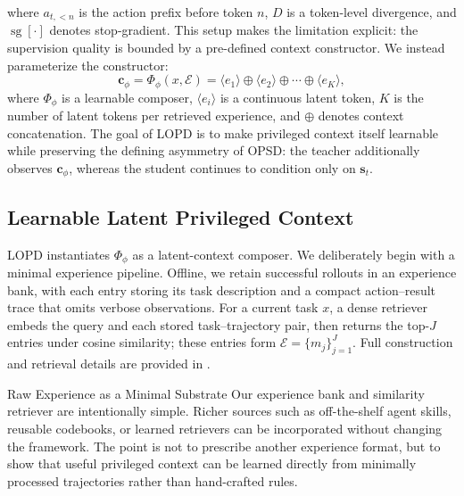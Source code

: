 \documentclass{article} %
\newcommand{\ourmethod}{{\textsc{LOPD}}\xspace}
\begin{document}
where $a_{t,<n}$ is the action prefix before token $n$, $D$ is a token-level divergence, and $\operatorname{sg}[\cdot]$ denotes stop-gradient. This setup makes the limitation explicit: the supervision quality is bounded by a pre-defined context constructor. We instead parameterize the constructor:
\begin{equation}
\boldsymbol{c}_{\phi}=\Phi_\phi(x,\mathcal{E})=\langle e_1\rangle\oplus\langle e_2\rangle\oplus\cdots\oplus\langle e_K\rangle,
\label{eq:learnable-context}
\end{equation}
where $\Phi_\phi$ is a learnable composer, $\langle e_i\rangle$ is a continuous latent token, $K$ is the number of latent tokens per retrieved experience, and $\oplus$ denotes context concatenation. The goal of \ourmethod is to make privileged context itself learnable while preserving the defining asymmetry of OPSD: the teacher additionally observes $\boldsymbol{c}_\phi$, whereas the student continues to condition only on $\boldsymbol{s}_t$.

\vspace{-0.6em}
\subsection{Learnable Latent Privileged Context}\label{sec:learnablelatent}
\vspace{-0.6em}
\ourmethod instantiates $\Phi_\phi$ as a latent-context composer. We deliberately begin with a minimal experience pipeline. Offline, we retain successful rollouts in an experience bank, with each entry storing its task description and a compact action--result trace that omits verbose observations. For a current task $x$, a dense retriever embeds the query and each stored task--trajectory pair, then returns the top-$J$ entries under cosine similarity; these entries form $\mathcal{E}=\{m_j\}_{j=1}^{J}$. Full construction and retrieval details are provided in .

\begin{insightbox}{Raw Experience as a Minimal Substrate}
Our experience bank and similarity retriever are intentionally simple. Richer sources such as off-the-shelf agent skills, reusable codebooks, or learned retrievers can be incorporated without changing the framework. The point is not to prescribe another experience format, but to show that useful privileged context can be learned directly from minimally processed trajectories rather than hand-crafted rules.
\end{insightbox}
\end{document}
